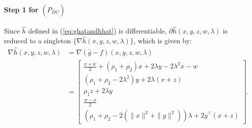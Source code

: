 \documentclass[3p]{elsarticle}
\begin{document}
\paragraph{\textbf{Step 1 for $(\hat{P}_{DC})$}} Since $\hat{h}$ defined in (\ref{eq:ghatandhhat}) is differentiable, $\partial \hat{h}(x,y,z,w,\lambda)$ is reduced to a singleton $\{\nabla \hat{h}(x,y,z,w,\lambda)\}$, which is given by:
\begin{equation}\label{eq:dhhat}
\begin{array}{rl}
\nabla \hat{h}(x,y,z,w,\lambda)  & = \nabla (\hat{g} - f) (x,y,z,w,\lambda)\\
&=\begin{bmatrix}
\frac{x+w}{2}+(\rho_1+\rho_2)x + 2\lambda y - 2\lambda^2 x - w \\
(\rho_1+\rho_2-2\lambda^2)y + 2\lambda(x+z) \\
\rho_1z + 2\lambda y \\
\frac{w-x}{2} \\
(\rho_1+\rho_2-2(\|x\|^2+\|y\|^2))\lambda + 2y^{\top}(x+z)
\end{bmatrix}.
\end{array}
\end{equation}
\end{document}
